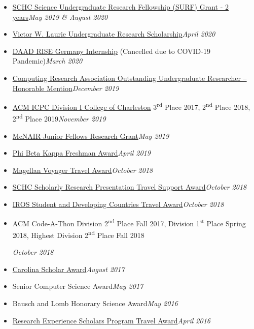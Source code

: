 \documentclass[\ifdefined\cv10pt\else10pt\fi,letterpaper]{moderncv}
\newcommand{\cvonly}[1]{\ifdefined\cv#1\fi\ignorespaces}
\renewcommand{\cvitem}[2]{\item {#1}\hfill\textit{#2}}
\newcommand{\st}{\textsuperscript{st}\xspace}
\newcommand{\nd}{\textsuperscript{nd}\xspace}
\newcommand{\rd}{\textsuperscript{rd}\xspace}
\begin{document}
\begin{itemize}
	\cvitem{\href{https://www.sc.edu/study/colleges_schools/honors_college/internal/beyond_the_classroom/undergraduate_research/surf_and_exploration_grants/index.php}{SCHC Science Undergraduate Research Fellowship (SURF) Grant - 2 years}}{May 2019 \& August 2020}
	\cvitem{\href{https://sc.edu/study/colleges_schools/artsandsciences/mathematics/study/awards_scholarships/}{Victor W. Laurie Undergraduate Research Scholarship}}{April 2020}
	\cvitem{\href{https://www.daad.de/rise/en/rise-germany/}{DAAD RISE Germany Internship} (Cancelled due to COVID-19 Pandemic)}{March 2020}
	\cvitem{\href{https://cra.org/about/awards/outstanding-undergraduate-researcher-award/}{Computing Research Association Outstanding Undergraduate Researcher -- Honorable Mention}}{December 2019}  %
	\cvonly{\cvitem{\href{http://compsci.cofc.edu/ACM-ICPC.php}{ACM ICPC Division I College of Charleston} 3\rd Place 2017, 2\nd Place 2018, 2\nd Place 2019}{November 2019}}
	\cvitem{\href{https://sc.edu/about/offices_and_divisions/undergraduate_research/apply_for_funding/other_money_opportunities/cec_mcnair-research-fellows-summer/index.php}{McNAIR Junior Fellows Research Grant}}{May 2019}  %
	\cvitem{\href{https://www.sc.edu/uofsc/announcements/posts/2019/04/university_awards_day_2019.php}{Phi Beta Kappa Freshman Award}}{April 2019}
	\cvitem{\href{https://www.sc.edu/about/offices_and_divisions/undergraduate_research/apply_for_funding/our_funding/conference-travel/index.php}{Magellan Voyager Travel Award}}{October 2018}
	\cvitem{\href{https://www.sc.edu/study/colleges_schools/honors_college/experience/undergraduate_research/index.php}{SCHC Scholarly Research Presentation Travel Support Award}}{October 2018}
	\cvitem{\href{https://www.iros2018.org/travel-grants}{IROS Student and Developing Countries Travel Award}}{October 2018}
	\cvonly{\cvitem{\parbox[t]{0.75\linewidth}{ACM Code-A-Thon Division 2\nd Place Fall 2017, Division 1\st Place Spring 2018, Highest Division 2\nd Place Fall 2018}\vspace*{0.6ex}}{October 2018}}
	\cvitem{\href{https://sc.edu/about/offices_and_divisions/undergraduate_admissions/honors_and_scholars_programs/top_scholars/}{Carolina Scholar Award}}{August 2017}
	\cvonly{\cvitem{Senior Computer Science Award}{May 2017}}
	\cvonly{\cvitem{Bausch and Lomb Honorary Science Award}{May 2016}}
	\cvonly{\cvitem{\href{https://www.scgssm.org/residential/academics/senior-research}{Research Experience Scholars Program Travel Award}}{April 2016}}
\end{itemize}
\end{document}
